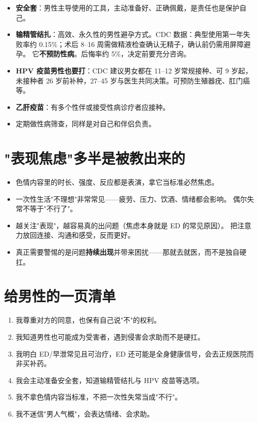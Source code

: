 \begin{itemize}[leftmargin=2em]
  \item \textbf{安全套}：男性主导使用的工具，主动准备好、正确佩戴，是责任也是保护自己。
  \item \textbf{输精管结扎}：高效、永久性的男性避孕方式。CDC 数据：典型使用第一年失败率约
        0.15\%；术后 8--16 周需做精液检查确认无精子，确认前仍需用屏障避孕。
        它\textbf{不预防性病}。后悔率约 5\%，决定前要充分咨询。
  \item \textbf{HPV 疫苗男性也要打}：CDC 建议男女都在 11--12 岁常规接种、可 9 岁起，
        未接种者 26 岁前补种，27--45 岁与医生共同决策。可预防生殖器疣、肛门癌等。
  \item \textbf{乙肝疫苗}：有多个性伴或接受性病诊疗者应接种。
  \item 定期做性病筛查，同样是对自己和伴侣负责。
\end{itemize}

\section{"表现焦虑"多半是被教出来的}

\begin{itemize}[leftmargin=2em]
  \item 色情内容里的时长、强度、反应都是表演，拿它当标准必然焦虑。
  \item 一次性生活"不理想"非常常见——疲劳、压力、饮酒、情绪都会影响。
        偶尔失常不等于"不行了"。
  \item 越关注"表现"，越容易真的出问题（焦虑本身就是 ED 的常见原因）。
        把注意力放回连接、沟通和感受，反而更好。
  \item 真正需要警惕的是问题\textbf{持续出现}并带来困扰——那就去就医，而不是独自硬扛。
\end{itemize}

\section{给男性的一页清单}

\begin{enumerate}[leftmargin=2em,itemsep=0.3em]
  \item 我尊重对方的同意，也保有自己说"不"的权利。
  \item 我知道男性也可能成为受害者，遇到侵害会求助而不是硬扛。
  \item 我明白 ED/早泄常见且可治疗，ED 还可能是全身健康信号，会去正规医院而非买补药。
  \item 我会主动准备安全套，知道输精管结扎与 HPV 疫苗等选项。
  \item 我不拿色情内容当标准，不把一次性失常当成"不行"。
  \item 我不迷信"男人气概"，会表达情绪、会求助。
\end{enumerate}

